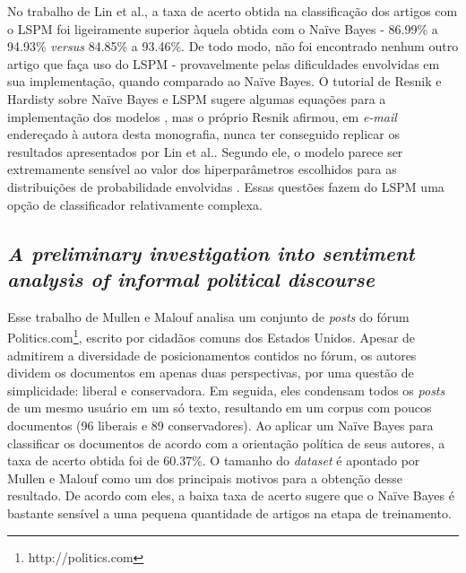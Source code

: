 No trabalho de Lin et al., a taxa de acerto obtida na classificação dos artigos com o LSPM foi ligeiramente superior àquela obtida com o Naïve Bayes -  86.99\% a 94.93\% \emph{versus} 84.85\% a 93.46\%. De todo modo, não foi encontrado nenhum outro artigo que faça uso do LSPM - provavelmente pelas dificuldades envolvidas em sua implementação, quando comparado ao Naïve Bayes. O tutorial de Resnik e Hardisty sobre Naïve Bayes e LSPM sugere algumas equações para a implementação dos modelos \cite{resnik}, mas o próprio Resnik afirmou, em \emph{e-mail} endereçado à autora desta monografia, nunca ter conseguido replicar os resultados apresentados por Lin et al.. Segundo ele, o modelo parece ser extremamente sensível ao valor dos hiperparâmetros escolhidos para as distribuições de probabilidade envolvidas \cite{mail-resnik}. Essas questões fazem do LSPM uma opção de classificador relativamente complexa. %

\subsection{\emph{A preliminary investigation into sentiment analysis of informal political discourse}}

Esse trabalho de Mullen e Malouf analisa um conjunto de \emph{posts} do fórum Politics.com\footnote{http://politics.com}, escrito por cidadãos comuns dos Estados Unidos. Apesar de admitirem a diversidade de posicionamentos contidos no fórum, os autores dividem os documentos em apenas duas perspectivas, por uma questão de simplicidade: liberal e conservadora. Em seguida, eles condensam todos os \emph{posts} de um mesmo usuário em um só texto, resultando em um corpus com poucos documentos (96 liberais e 89 conservadores). Ao aplicar um Naïve Bayes para classificar os documentos de acordo com a orientação política de seus autores, a taxa de acerto obtida foi de 60.37\%. O tamanho do \emph{dataset} é apontado por Mullen e Malouf como um dos principais motivos para a obtenção desse resultado. De acordo com eles, a baixa taxa de acerto sugere que o Naïve Bayes é bastante sensível a uma pequena quantidade de artigos na etapa de treinamento. 


